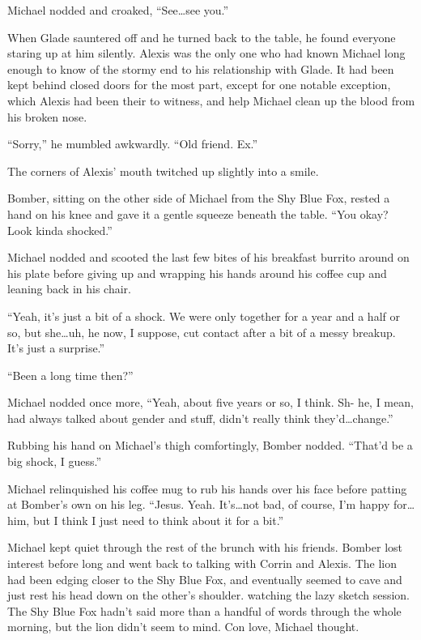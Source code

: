 \documentclass[12pt,letterpaper,oneside]{memoir}
\begin{document}
  Michael nodded and croaked, ``See\ldots{}see you.''

  When Glade sauntered off and he turned back to the table, he found everyone staring up at him silently. Alexis was the only one who had known Michael long enough to know of the stormy end to his relationship with Glade.  It had been kept behind closed doors for the most part, except for one notable exception, which Alexis had been their to witness, and help Michael clean up the blood from his broken nose.

  ``Sorry,'' he mumbled awkwardly.  ``Old friend.  Ex.''

  The corners of Alexis' mouth twitched up slightly into a smile.

  Bomber, sitting on the other side of Michael from the Shy Blue Fox, rested a hand on his knee and gave it a gentle squeeze beneath the table.  ``You okay?  Look kinda shocked.''

  Michael nodded and scooted the last few bites of his breakfast burrito around on his plate before giving up and wrapping his hands around his coffee cup and leaning back in his chair.

  ``Yeah, it's just a bit of a shock.  We were only together for a year and a half or so, but she\ldots{}uh, he now, I suppose, cut contact after a bit of a messy breakup. It's just a surprise.''

  ``Been a long time then?''

  Michael nodded once more, ``Yeah, about five years or so, I think.  Sh- he, I mean, had always talked about gender and stuff, didn't really think they'd\ldots{}change.''

  Rubbing his hand on Michael's thigh comfortingly, Bomber nodded.  ``That'd be a big shock, I guess.''

  Michael relinquished his coffee mug to rub his hands over his face before patting at Bomber's own on his leg.  ``Jesus.  Yeah.  It's\ldots{}not bad, of course, I'm happy for\ldots{}him, but I think I just need to think about it for a bit.''

  Michael kept quiet through the rest of the brunch with his friends.  Bomber lost interest before long and went back to talking with Corrin and Alexis.  The lion had been edging closer to the Shy Blue Fox, and eventually seemed to cave and just rest his head down on the other's shoulder. watching the lazy sketch session.  The Shy Blue Fox hadn't said more than a handful of words through the whole morning, but the lion didn't seem to mind.  Con love, Michael thought.
\end{document}
